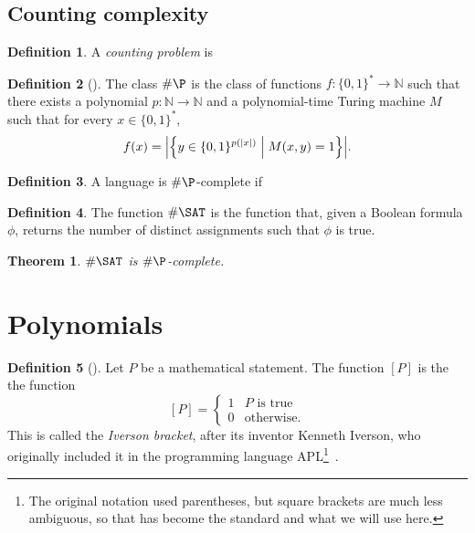 \documentclass[english,12pt]{reedthesis}
\theoremstyle{plain}
\newtheorem{thm}{Theorem}[section]
\theoremstyle{definition}
\newtheorem{defn}[defn]{Definition}
\theoremstyle{remark}
\DeclarePairedDelimiter{\abs}{\lvert}{\rvert}
\newcommand{\middlemid}{%
  \ensuremath{\;\middle\vert\;}
}
\begin{document}
\subsection{Counting complexity}

\begin{defn}\label{def:counting-problem}
  A \emph{counting problem} is %
\end{defn}

\begin{defn}[{\cite[Def.\ 9.2]{AB09}}]\label{def:hash-p}
  The class $\#\P$ is the class of functions $f: \{0, 1\}^{*} \rightarrow \mathbb{N}$ such that
  there exists a polynomial $p: \mathbb{N} \rightarrow \mathbb{N}$ and a polynomial-time Turing machine $M$
  such that for every $x \in \{0, 1\}^{*}$,
  \begin{equation}
    f(x) = \abs*{\mleft\{y \in \{0, 1\}^{p(\abs{x})} \middlemid M(x, y) = 1\mright\}}.
  \end{equation}
\end{defn}

\begin{defn}\label{def:hash-p-complete}
  A language is $\#\P$-complete if %
\end{defn}

\begin{defn}\label{def:hash-sat}
  The function $\#\SAT$ is the function that, given a Boolean formula $\phi$,
  returns the number of distinct assignments such that $\phi$ is true.
\end{defn}

\begin{thm}\label{thm-hash-sat-is-complete}
  $\#\SAT$ is $\#\P$-complete.
\end{thm}

\section{Polynomials}\label{sec:polynomial}

\begin{defn}[{\cite{Knu92}}]\label{def:iverson-bracket}
  Let $P$ be a mathematical statement. The function $[P]$ is the the function
  \begin{equation}\label{eqn:iverson-bracket}
    [P] = \begin{cases}
      1 & P \text{ is true} \\
      0 & \text{otherwise.}
    \end{cases}
  \end{equation}
  This is called the \emph{Iverson bracket}, after its inventor Kenneth Iverson,
  who originally included it in the programming language APL\footnote{The
    original notation used parentheses, but square brackets are much less
    ambiguous, so that has become the standard and what we will use
    here.}~\cite[11]{APL}.
\end{defn}
\end{document}
